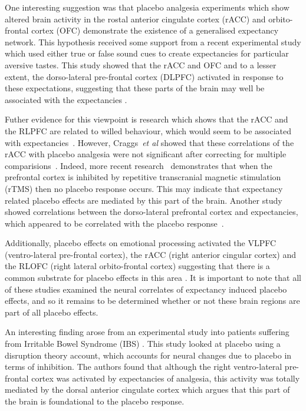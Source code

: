 One interesting suggestion was that placebo analgesia experiments which show altered brain activity in the rostal anterior cingulate cortex (rACC) and orbito-frontal cortex (OFC) demonstrate the existence of a generalised expectancy network. This hypothesis received some support from a recent experimental study which used either true or false sound cues to create expectancies for particular aversive tastes. This study showed that the rACC and OFC and to a lesser extent, the dorso-lateral pre-frontal cortex (DLPFC) activated in response to these expectations, suggesting that these parts of the brain may well be associated with the expectancies  \cite{Sarinopoulos2006}. 

Futher evidence for this viewpoint is research which shows that the rACC and the RLPFC are related to willed behaviour, which would seem to be associated with expectancies~\cite{Beauregard2007a}.  However, Craggs~\textit{et al} showed that these correlations of the rACC with placebo analgesia were not significant after correcting for multiple comparisions~\cite{Craggs2008a}. Indeed, more recent research~\cite{krummenacher2010prefrontal} demonstrates that when the prefrontal cortex is inhibited by repetitive transcranial magnetic stimulation (rTMS) then no placebo response occurs. This may indicate that expectancy related placebo effects are mediated by this part of the brain. Another study showed correlations between the dorso-lateral prefrontal cortex and expectancies, which appeared to be correlated with the placebo response~\cite{Zubieta2006}. 

Additionally, placebo effects on emotional processing activated the VLPFC (ventro-lateral pre-frontal cortex), the rACC (right anterior cingular cortex) and the RLOFC (right lateral orbito-frontal cortex) suggesting that there is a common substrate for placebo effects in this area \cite{Beauregard2007a}. It is important to note that all of these studies examined the neural correlates of expectancy induced placebo effects, and so it remains to be determined whether or not these brain regions are part of all placebo effects. 
 
An interesting finding arose from an experimental study into patients suffering from Irritable Bowel Syndrome (IBS) \cite{Lieberman2004}. This study looked at placebo using a disruption theory account, which accounts for neural changes due to placebo in terms of inhibition. The authors found that although the right ventro-lateral pre-frontal cortex was activated by expectancies of analgesia, this activity was totally mediated by the dorsal anterior cingulate cortex which argues that this part of the brain is foundational to the placebo response.  

